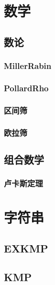 \documentclass{article}
\begin{document}
\begin{multicols*}{3}
\section{数学}
\subsection{数论}
\subsubsection{MillerRabin}


\subsubsection{PollardRho}


\subsubsection{区间筛}


\subsubsection{欧拉筛}


\subsection{组合数学}
\subsubsection{卢卡斯定理}


\section{字符串}
\subsection{EXKMP}


\subsection{KMP}



\end{multicols*}
\end{document}

